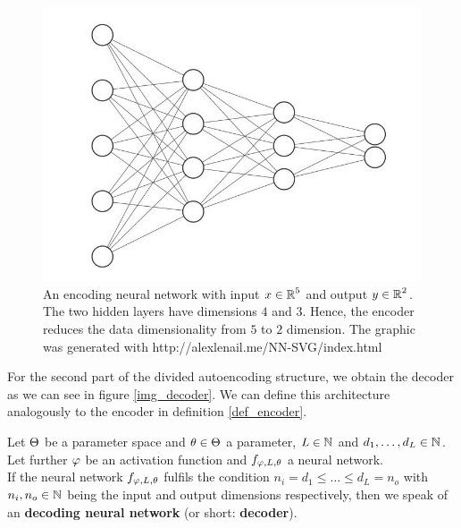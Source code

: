 \begin{figure}
\begin{center}
   \begin{minipage}[b]{0.9\linewidth}
      \includegraphics[width=\linewidth]{encoder}
      \caption{An encoding neural network with input $x\in \operatorname{\mathbb{R}}^5$ and output $y \in \operatorname{\mathbb{R}}^2$. The two hidden layers have dimensions $4$ and $3$. Hence, the encoder reduces the data dimensionality from $5$ to $2$ dimension. The graphic was generated with http://alexlenail.me/NN-SVG/index.html}\label{img_encoder}
	\end{minipage}
\end{center}
\end{figure}


For the second part of the divided autoencoding structure, we obtain the decoder as we can see in figure \ref{img_decoder}. We can define this architecture analogously to the encoder in definition \ref{def_encoder}.


\begin{definition}\label{def_decoder}
Let $\operatorname{\Theta}$ be a parameter space and $\theta \in \operatorname{\Theta}$ a parameter, $L\in \operatorname{\mathbb{N}}$ and $d_1,\ldots, d_L\in\operatorname{\mathbb{N}}$. Let further $\operatorname{\varphi}$ be an activation function and $f_{\operatorname{\varphi},L,\theta}$ a neural network.\\
If the neural network $f_{\operatorname{\varphi},L,\theta}$ fulfils the condition $n_i= d_1 \leq \ldots \leq d_L = n_o$ with $n_i, n_o \in \operatorname{\mathbb{N}}$ being the input and output dimensions respectively, then we speak of an \textbf{decoding neural network} (or short: \textbf{decoder}).
\end{definition}


